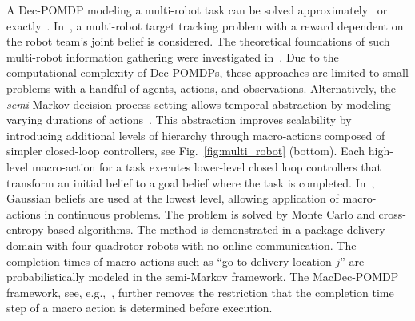 \documentclass[journal]{IEEEtran}
\begin{document}
A Dec-POMDP modeling a multi-robot task can be solved approximately~\cite{ragi2014decentralized} or exactly~\cite{lauri2017multi}.
In~\cite{lauri2017multi}, a multi-robot target tracking problem with a reward dependent on the robot team's joint belief is considered.
The theoretical foundations of such multi-robot information gathering were investigated in~\cite{lauri2020multi,lauri2020multib}.
Due to the computational complexity of Dec-POMDPs, these approaches are limited to small problems with a handful of agents, actions, and observations.
Alternatively, the \emph{semi}-Markov decision process setting allows temporal abstraction by modeling varying durations of actions~\cite{amato2016policy,omidshafiei2015decentralized,omidshafiei2017decentralized}.
This abstraction improves scalability by introducing additional levels of hierarchy through macro-actions composed of simpler closed-loop controllers, see Fig.~\ref{fig:multi_robot} (bottom).
Each high-level macro-action for a task executes lower-level closed loop controllers that transform an initial belief to a goal belief where the task is completed.
In~\cite{omidshafiei2017decentralized}, Gaussian beliefs are used at the lowest level, allowing application of macro-actions in continuous problems.
The problem is solved by Monte Carlo and cross-entropy based algorithms.
The method is demonstrated in a package delivery domain with four quadrotor robots with no online communication.
The completion times of macro-actions such as ``go to delivery location $j$'' are probabilistically modeled in the semi-Markov framework.
{The MacDec-POMDP framework, see, e.g.,~\cite{amato2016policy}, further removes the restriction that the completion time step of a macro action is determined before execution.}
\end{document}
